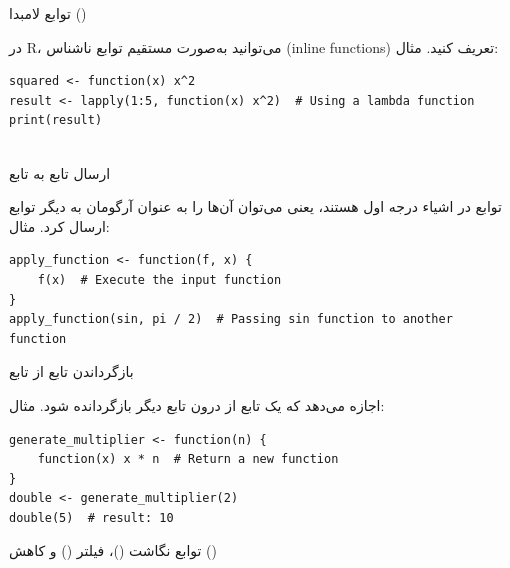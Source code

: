 \documentclass[11pt, a4paper, oneside]{book}
\newcounter{itemadded}
\let\LaTeXStandardEnumerateBegin\enumerate
\let\LaTeXStandardEnumerateEnd\endenumerate
\renewenvironment{enumerate}{%
	\LaTeXStandardEnumerateBegin%
	\setcounter{itemadded}{0}
}{%
	\LaTeXStandardEnumerateEnd%
}%
\begin{document}
			\begin{enumerate}
				
				\item {\large توابع لامبدا ()} \par
				در R، می‌توانید به‌صورت مستقیم توابع ناشناس (inline functions) تعریف کنید.
				مثال:
					\begin{latin}
						\begin{lstlisting}[caption={\lr{Lambda Functions}}] 
squared <- function(x) x^2
result <- lapply(1:5, function(x) x^2)  # Using a lambda function
print(result)
		
						\end{lstlisting}
					\end{latin}
				
				
				\item {\large ارسال تابع به تابع} \par
				توابع در  اشیاء درجه اول هستند، یعنی می‌توان آن‌ها را به عنوان آرگومان به دیگر توابع ارسال کرد.
				مثال:
					\begin{latin}
						\begin{lstlisting}[caption={\lr{Passing function to another function}}] 
apply_function <- function(f, x) {
	f(x)  # Execute the input function
}
apply_function(sin, pi / 2)  # Passing sin function to another function

						\end{lstlisting}
					\end{latin}
				
				\item {\large بازگرداندن تابع از تابع} \par
				 اجازه می‌دهد که یک تابع از درون تابع دیگر بازگردانده شود.
				مثال:
					\begin{latin}
						\begin{lstlisting}[caption={\lr{Return a function into function}}] 
generate_multiplier <- function(n) {
	function(x) x * n  # Return a new function
}
double <- generate_multiplier(2)
double(5)  # result: 10

						\end{lstlisting}
					\end{latin}
				
				\item {\large توابع نگاشت ()، فیلتر () و کاهش ()} \par
				
					\begin{itemize}
						

\end{itemize}
\end{enumerate}
\end{document}
